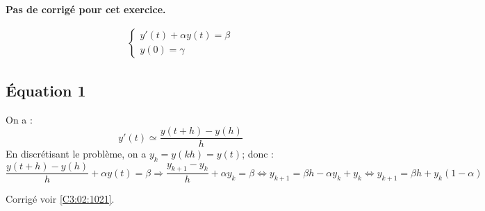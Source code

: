\normaltrue \difficilefalse \tdifficilefalse
\correctionfalse


\setcounter{question}{0}
\ifcorrection
\else
\textbf{Pas de corrigé pour cet exercice.}
\fi


\begin{eqnarray}
\left\{
\begin{array}{l}
y'(t) + \alpha y(t) = \beta \\
y(0) = \gamma
\end{array}
\right.
\end{eqnarray}


\ifprof

\subsection*{Équation 1}
On a :
$$
y'(t) \simeq \dfrac{y(t+h)-y(h)}{h}
$$
En discrétisant le problème, on a $y_k=y(kh)=y(t)$; donc : 
$$
\dfrac{y(t+h)-y(h)}{h} + \alpha y(t) = \beta \Longrightarrow 
\dfrac{y_{k+1}-y_k}{h} + \alpha y_k = \beta \Longleftrightarrow 
y_{k+1}  = \beta h - \alpha y_k + y_k \Longleftrightarrow 
y_{k+1}  = \beta h + y_k\left(1 - \alpha \right) 
$$
\else
\fi



 

\ifprof
\else
\begin{flushright}
\footnotesize{Corrigé  voir \ref{C3:02:1021}.}
\end{flushright}%
\fi
